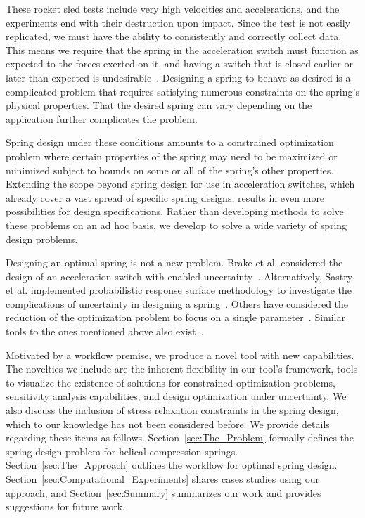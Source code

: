 \documentclass[10pt]{article}
\begin{document}
These rocket sled tests include very high velocities and accelerations, and the experiments end with their destruction upon impact. Since the test is not easily replicated, we must have the ability to consistently and correctly collect data. This means we require that the spring in the acceleration switch must function as expected to the forces exerted on it, and having a switch that is closed earlier or later than expected is undesirable~\cite{IMSM2010}. Designing a spring to behave as desired is a complicated problem that requires satisfying numerous constraints on the spring's physical properties. That the desired spring can vary depending on the application further complicates the problem. 

Spring design under these conditions amounts to a constrained optimization problem where certain properties of the spring may need to be maximized or minimized subject to bounds on some or all of the spring's other properties. Extending the scope beyond spring design for use in acceleration switches, which already cover a vast spread of specific spring designs, results in even more possibilities for design specifications. Rather than developing methods to solve these problems on an ad hoc basis, we develop to solve a wide variety of spring design problems. 

Designing an optimal spring is not a new problem. Brake et al. considered the design of an acceleration switch with enabled uncertainty~\cite{IMSM2010}. Alternatively, Sastry et al. implemented probabilistic response surface methodology to investigate the complications of uncertainty in designing a spring~\cite{Reliability}. Others have considered the reduction of the optimization problem to focus on a single parameter~\cite{Robust}. Similar tools to the ones mentioned above also exist~\cite{Paredes}.

Motivated by a workflow premise, we produce a novel tool with new capabilities. The novelties we include are the inherent flexibility in our tool's framework, tools to visualize the existence of solutions for constrained optimization problems, sensitivity analysis capabilities, and design optimization under uncertainty. We also discuss the inclusion of stress relaxation constraints in the spring design, which to our knowledge has not been considered before. We provide details regarding these items as follows. Section~\ref{sec:The_Problem} formally defines the spring design problem for helical compression springs. Section~\ref{sec:The_Approach} outlines the workflow for optimal spring design. Section~\ref{sec:Computational_Experiments} shares cases studies using our approach, and Section~\ref{sec:Summary} summarizes our work and provides suggestions for future work.
\end{document}
